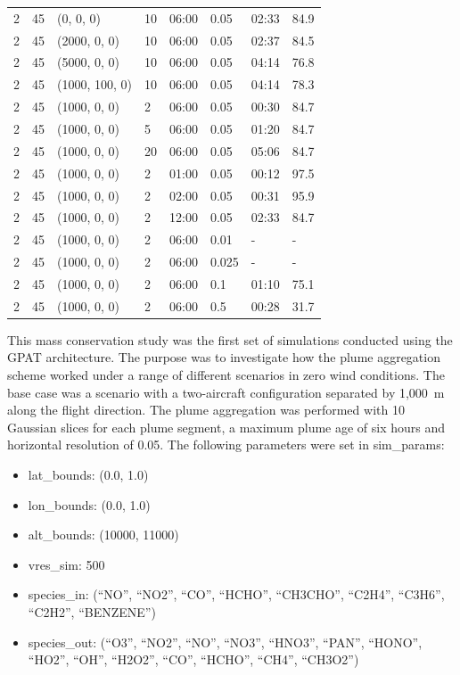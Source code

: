 \begin{table}[]
\begin{tabular}{@{}llllllll@{}}
    2  & 45 & (0, 0, 0)      & 10 & 06:00 & 0.05  & 02:33 & 84.9 \\
    2  & 45 & (2000, 0, 0)   & 10 & 06:00 & 0.05  & 02:37 & 84.5 \\
    2  & 45 & (5000, 0, 0)   & 10 & 06:00 & 0.05  & 04:14 & 76.8 \\
    2  & 45 & (1000, 100, 0) & 10 & 06:00 & 0.05  & 04:14 & 78.3 \\ \midrule
    2  & 45 & (1000, 0, 0)   & 2  & 06:00 & 0.05  & 00:30 & 84.7 \\
    2  & 45 & (1000, 0, 0)   & 5  & 06:00 & 0.05  & 01:20 & 84.7 \\
    2  & 45 & (1000, 0, 0)   & 20 & 06:00 & 0.05  & 05:06 & 84.7 \\ \midrule
    2  & 45 & (1000, 0, 0)   & 2  & 01:00 & 0.05  & 00:12 & 97.5 \\
    2  & 45 & (1000, 0, 0)   & 2  & 02:00 & 0.05  & 00:31 & 95.9 \\
    2  & 45 & (1000, 0, 0)   & 2  & 12:00 & 0.05  & 02:33 & 84.7 \\ \midrule
    2  & 45 & (1000, 0, 0)   & 2  & 06:00 & 0.01  & -     & -    \\
    2  & 45 & (1000, 0, 0)   & 2  & 06:00 & 0.025 & -     & -    \\
    2  & 45 & (1000, 0, 0)   & 2  & 06:00 & 0.1   & 01:10 & 75.1 \\
    2  & 45 & (1000, 0, 0)   & 2  & 06:00 & 0.5   & 00:28 & 31.7 \\ \bottomrule
    \end{tabular}
    \end{table}

This mass conservation study was the first set of simulations conducted using the GPAT architecture. The purpose was to investigate how the plume aggregation scheme worked under a range of different scenarios in zero wind conditions. 
The base case was a scenario with a two-aircraft configuration separated by 1,000~m along the flight direction. The plume aggregation was performed with 10 Gaussian slices for each plume segment, a maximum plume age of six hours and horizontal resolution of 0.05\textdegree. The following parameters were set in sim\_params:
\begin{itemize}
    \item lat\_bounds: (0.0, 1.0)
    \item lon\_bounds: (0.0, 1.0)
    \item alt\_bounds: (10000, 11000)
    \item vres\_sim: 500
    \item species\_in: (``NO'', ``NO2'', ``CO'', ``HCHO'', ``CH3CHO'', ``C2H4'', ``C3H6'', ``C2H2'', ``BENZENE'')
    \item species\_out: (``O3'', ``NO2'', ``NO'', ``NO3'', ``HNO3'', ``PAN'', ``HONO'', ``HO2'', ``OH'', ``H2O2'', ``CO'', ``HCHO'', ``CH4'', ``CH3O2'')
\end{itemize}

